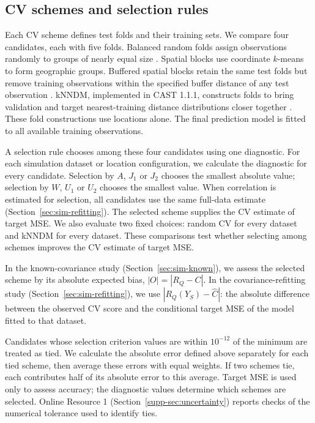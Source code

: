 \subsection{CV schemes and selection rules}
\label{sec:cv-selection}
Each CV scheme defines test folds and their training sets. We compare four candidates, each with five folds. Balanced random folds assign observations randomly to groups of nearly equal size \citep{arlot2010survey}. Spatial blocks use coordinate $k$-means \citep{hartigan1979kmeans} to form geographic groups. Buffered spatial blocks retain the same test folds but remove training observations within the specified buffer distance of any test observation \citep{roberts2017cross}. kNNDM, implemented in CAST 1.1.1, constructs folds to bring validation and target nearest-training distance distributions closer together \citep{linnenbrink2024knndm}. These fold constructions use locations alone. The final prediction model is fitted to all available training observations.

A selection rule chooses among these four candidates using one diagnostic. For each simulation dataset or location configuration, we calculate the diagnostic for every candidate. Selection by $A$, $J_1$ or $J_2$ chooses the smallest absolute value; selection by $W$, $U_1$ or $U_2$ chooses the smallest value. When correlation is estimated for selection, all candidates use the same full-data estimate (Section~\ref{sec:sim-refitting}). The selected scheme supplies the CV estimate of target MSE. We also evaluate two fixed choices: random CV for every dataset and kNNDM for every dataset. These comparisons test whether selecting among schemes improves the CV estimate of target MSE.

In the known-covariance study (Section~\ref{sec:sim-known}), we assess the selected scheme by its absolute expected bias, $|O|=|R_Q-C|$. In the covariance-refitting study (Section~\ref{sec:sim-refitting}), we use \mbox{$|R_Q(Y_S)-\widehat C|$}: the absolute difference between the observed CV score and the conditional target MSE of the model fitted to that dataset.

Candidates whose selection criterion values are within $10^{-12}$ of the minimum are treated as tied. We calculate the absolute error defined above separately for each tied scheme, then average these errors with equal weights. If two schemes tie, each contributes half of its absolute error to this average. Target MSE is used only to assess accuracy; the diagnostic values determine which schemes are selected. Online Resource 1 (Section~\ref*{supp-sec:uncertainty}) reports checks of the numerical tolerance used to identify ties.

